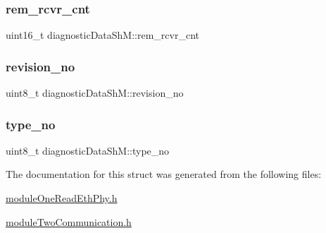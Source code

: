 \subsubsection{\texorpdfstring{rem\+\_\+rcvr\+\_\+cnt}{rem\_rcvr\_cnt}}
{\footnotesize\ttfamily uint16\+\_\+t diagnostic\+Data\+Sh\+M\+::rem\+\_\+rcvr\+\_\+cnt}

\mbox{\label{structdiagnostic_data_sh_m_a6b7ece4c9d83b8829833218e40225a01}} 
\subsubsection{\texorpdfstring{revision\+\_\+no}{revision\_no}}
{\footnotesize\ttfamily uint8\+\_\+t diagnostic\+Data\+Sh\+M\+::revision\+\_\+no}

\mbox{\label{structdiagnostic_data_sh_m_aefd4b509acae31fc6b31afbf4e470c17}} 
\subsubsection{\texorpdfstring{type\+\_\+no}{type\_no}}
{\footnotesize\ttfamily uint8\+\_\+t diagnostic\+Data\+Sh\+M\+::type\+\_\+no}



The documentation for this struct was generated from the following files\+:\begin{DoxyCompactItemize}
\item 
\mbox{\hyperlink{module_one_read_eth_phy_8h}{module\+One\+Read\+Eth\+Phy.\+h}}\item 
\mbox{\hyperlink{module_two_communication_8h}{module\+Two\+Communication.\+h}}\end{DoxyCompactItemize}
